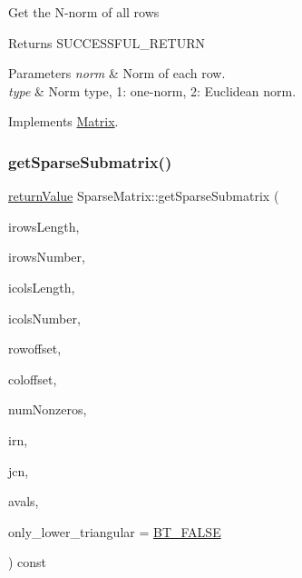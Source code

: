 Get the N-\/norm of all rows \begin{DoxyReturn}{Returns}
S\+U\+C\+C\+E\+S\+S\+F\+U\+L\+\_\+\+R\+E\+T\+U\+RN 
\end{DoxyReturn}

\begin{DoxyParams}{Parameters}
{\em norm} & Norm of each row. \\
\hline
{\em type} & Norm type, 1\+: one-\/norm, 2\+: Euclidean norm. \\
\hline
\end{DoxyParams}


Implements \hyperlink{class_matrix_a7809892ec8eefd5963915b56564917ed}{Matrix}.

\mbox{\label{class_sparse_matrix_a41aec3bb6e320d1babc7d09a52d979f6}} 
\subsubsection{\texorpdfstring{get\+Sparse\+Submatrix()}{getSparseSubmatrix()}}
{\footnotesize\ttfamily \hyperlink{_message_handling_8hpp_a81d556f613bfbabd0b1f9488c0fa865e}{return\+Value} Sparse\+Matrix\+::get\+Sparse\+Submatrix (\begin{DoxyParamCaption}\item[{\hyperlink{_types_8hpp_ab6fd6105e64ed14a0c9281326f05e623}{int\+\_\+t}}]{irows\+Length,  }\item[{const \hyperlink{_types_8hpp_ab6fd6105e64ed14a0c9281326f05e623}{int\+\_\+t} $\ast$const}]{irows\+Number,  }\item[{\hyperlink{_types_8hpp_ab6fd6105e64ed14a0c9281326f05e623}{int\+\_\+t}}]{icols\+Length,  }\item[{const \hyperlink{_types_8hpp_ab6fd6105e64ed14a0c9281326f05e623}{int\+\_\+t} $\ast$const}]{icols\+Number,  }\item[{\hyperlink{_types_8hpp_ab6fd6105e64ed14a0c9281326f05e623}{int\+\_\+t}}]{rowoffset,  }\item[{\hyperlink{_types_8hpp_ab6fd6105e64ed14a0c9281326f05e623}{int\+\_\+t}}]{coloffset,  }\item[{\hyperlink{_types_8hpp_ab6fd6105e64ed14a0c9281326f05e623}{int\+\_\+t} \&}]{num\+Nonzeros,  }\item[{\hyperlink{_types_8hpp_ab6fd6105e64ed14a0c9281326f05e623}{int\+\_\+t} $\ast$}]{irn,  }\item[{\hyperlink{_types_8hpp_ab6fd6105e64ed14a0c9281326f05e623}{int\+\_\+t} $\ast$}]{jcn,  }\item[{\hyperlink{qp_o_a_s_e_s__wrapper_8h_a0d00e2b3dfadee81331bbb39068570c4}{real\+\_\+t} $\ast$}]{avals,  }\item[{\hyperlink{_types_8hpp_a20f82124c82b6f5686a7fce454ef9089}{Boolean\+Type}}]{only\+\_\+lower\+\_\+triangular = {\ttfamily \hyperlink{_types_8hpp_a20f82124c82b6f5686a7fce454ef9089a85b8a20e72a8bea5dd10a6007fe3071e}{B\+T\+\_\+\+F\+A\+L\+SE}} }\end{DoxyParamCaption}) const\hspace{0.3cm}{\ttfamily [virtual]}}

